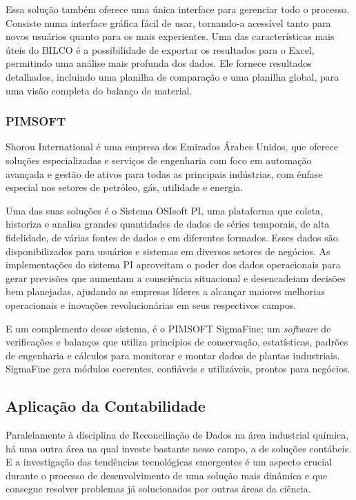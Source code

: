 Essa solução também oferece uma única interface para gerenciar todo o processo. Consiste numa interface gráfica fácil de usar, tornando-a acessível tanto para novos usuários quanto para os mais experientes. Uma das características mais úteis do BILCO é a possibilidade de exportar os resultados para o Excel, permitindo uma análise mais profunda dos dados. Ele fornece resultados detalhados, incluindo uma planilha de comparação e uma planilha global, para uma visão completa do balanço de material.

\subsubsection{PIMSOFT}

Shorou International é uma empresa dos Emirados Árabes Unidos, que oferece soluções especializadas e serviços de engenharia com foco em automação avançada e gestão de ativos para todas as principais indústrias, com ênfase especial nos setores de petróleo, gás, utilidade e energia.

Uma das suas soluções é o Sistema OSIsoft PI, uma plataforma que coleta, historiza e analisa grandes quantidades de dados de séries temporais, de alta fidelidade, de várias fontes de dados e em diferentes formados. Esses dados são disponibilizados para usuários e sistemas em diversos setores de negócios. As implementações do sistema PI aproveitam o poder dos dados operacionais para gerar previsões que aumentam a consciência situacional e desencadeiam decisões bem planejadas, ajudando as empresas líderes a alcançar maiores melhorias operacionais e inovações revolucionárias em seus respectivos campos. 

E um complemento desse sistema, é o PIMSOFT SigmaFine; um \textit{software} de verificações e balanços que utiliza princípios de conservação, estatísticas, padrões de engenharia e cálculos para monitorar e montar dados de plantas industriais. SigmaFine gera módulos coerentes, confiáveis e utilizáveis, prontos para negócios.

\subsection{Aplicação da Contabilidade}

Paralelamente à disciplina de Reconciliação de Dados na área industrial química, há uma outra área na qual investe bastante nesse campo, a de soluções contábeis. E a investigação das tendências tecnológicas emergentes é um aspecto crucial durante o processo de desenvolvimento de uma solução mais dinâmica e que consegue resolver problemas já solucionados por outras áreas da ciência.

